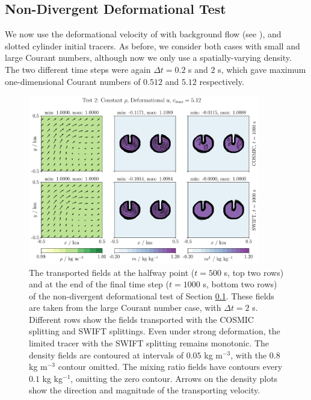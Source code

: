 \documentclass[11pt,a4paper]{article}
\begin{document}
\subsection{Non-Divergent Deformational Test} \label{sec:test2}
We now use the deformational velocity of \cite{skamarock2006limiters} with background flow (see \citet{kent2020positive}), and slotted cylinder initial tracers. As before, we consider both cases with small and large Courant numbers, although now we only use a spatially-varying density.
The two different time steps were again $\Delta t=0.2$ s and $2$ s, which gave maximum one-dimensional Courant numbers of $0.512$ and $5.12$ respectively. \\
\begin{figure}[ht!]
\centering
\includegraphics[width=0.9\textwidth]{fig_3_deformational.jpg}
\caption{The transported fields at the halfway point ($t=500$ s, top two rows) and at the end of the final time step ($t=1000$ s, bottom two rows) of the non-divergent deformational test of Section \ref{sec:test2}. These fields are taken from the large Courant number case, with $\Delta t=2$ s. Different rows show the fields transported with the COSMIC splitting and SWIFT splittings.
Even under strong deformation, the limited tracer with the SWIFT splitting remains monotonic.
The density fields are contoured at intervals of $0.05$ kg m$^{-3}$, with the $0.8$ kg m$^{-3}$ contour omitted.
The mixing ratio fields have contours every $0.1$ kg kg$^{-1}$, omitting the zero contour.
Arrows on the density plots show the direction and magnitude of the transporting velocity.}\label{fig:test2}
\end{figure} \\
\\
\end{document}
